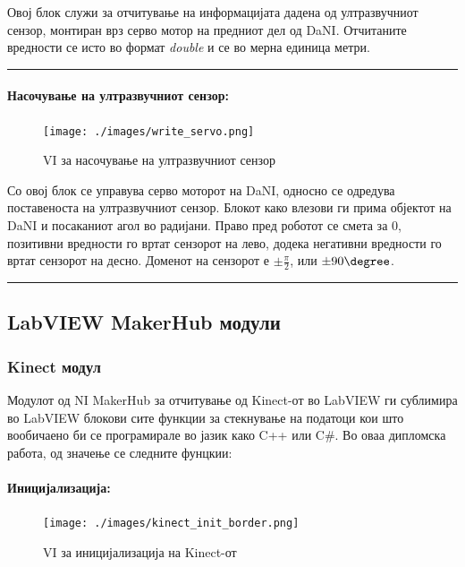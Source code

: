 \documentclass[11pt]{article}
\begin{document}
        Овој блок служи за отчитување на информацијата дадена од ултразвучниот сензор, монтиран врз серво мотор на предниот дел од DaNI. Отчитаните вредности се исто во формат \textit{double} и се во мерна единица метри.\\
        \textcolor[RGB]{150,150,150}{\rule{\linewidth}{1.6pt}}

    \paragraph{Насочување на ултразвучниот сензор:\\}
    	\begin{figure}[H]
        \centering
				\texttt{[image: ./images/write\_servo.png]}
				\caption{VI за насочување на ултразвучниот сензор}
				\label{fig:write_servo.png}
				\end{figure}

      Со овој блок се управува серво моторот на DaNI, односно се одредува поставеноста на ултразвучниот сензор. Блокот како влезови ги прима објектот на DaNI и посаканиот агол во радијани. Право пред роботот се смета за 0, позитивни вредности го вртат сензорот на лево, додека негативни вредности го вртат сензорот на десно. Доменот на сензорот е $ \pm \frac{\pi}{2}$, или $\pm 90 \degree$.\\
      \textcolor[RGB]{150,150,150}{\rule{\linewidth}{1.6pt}}

  \subsection{LabVIEW MakerHub модули}
    \subsubsection{Kinect модул}
      Модулот од NI MakerHub за отчитување од Kinect-от во LabVIEW ги сублимира во LabVIEW блокови сите функции за стекнување на податоци кои што вообичаено би се програмирале во јазик како C++ или C\#. Во оваа дипломска работа, од значење се следните фунцкии:

      \paragraph{Иницијализација:\\}
	      \begin{figure}[H]
          \centering
	        \texttt{[image: ./images/kinect\_init\_border.png]}
	        \caption{VI за иницијализација на Kinect-от}
		      \label{fig:kinect_init.png}
	        \end{figure}
\end{document}
